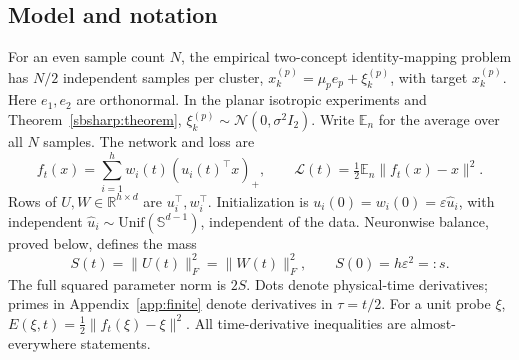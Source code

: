 \documentclass[10pt]{article}
\theoremstyle{remark}\newtheorem{remark}[theorem]{Remark}
\begin{document}
\subsection{Model and notation}
For an even sample count $N$, the empirical two-concept identity-mapping
problem has $N/2$ independent samples per cluster,
$x_k^{(p)}=\mu_pe_p+\xi_k^{(p)}$, with target $x_k^{(p)}$.
Here $e_1,e_2$ are orthonormal. In the planar isotropic experiments and
Theorem~\ref{sbsharp:theorem}, $\xi_k^{(p)}\sim\mathcal N(0,\sigma^2I_2)$.
Write $\mathbb E_n$ for the average over all $N$ samples. The network and loss are
\[
 f_t(x)=\sum_{i=1}^h w_i(t)(u_i(t)^\top x)_+,
 \qquad \mathcal L(t)=\tfrac12\mathbb E_n\|f_t(x)-x\|^2.
\]
Rows of $U,W\in\mathbb R^{h\times d}$ are $u_i^\top,w_i^\top$.
Initialization is $u_i(0)=w_i(0)=\varepsilon\widehat u_i$, with independent
$\widehat u_i\sim\mathrm{Unif}(\mathbb S^{d-1})$, independent of the data.
Neuronwise balance, proved below, defines the mass
\[
 S(t)=\|U(t)\|_F^2=\|W(t)\|_F^2,\qquad S(0)=h\varepsilon^2=:s.
\]
The full squared parameter norm is $2S$.
Dots denote physical-time derivatives; primes in Appendix~\ref{app:finite}
denote derivatives in $\tau=t/2$. For a unit probe $\xi$,
$E(\xi,t)=\tfrac12\|f_t(\xi)-\xi\|^2$.
All time-derivative inequalities are almost-everywhere statements.
\end{document}
